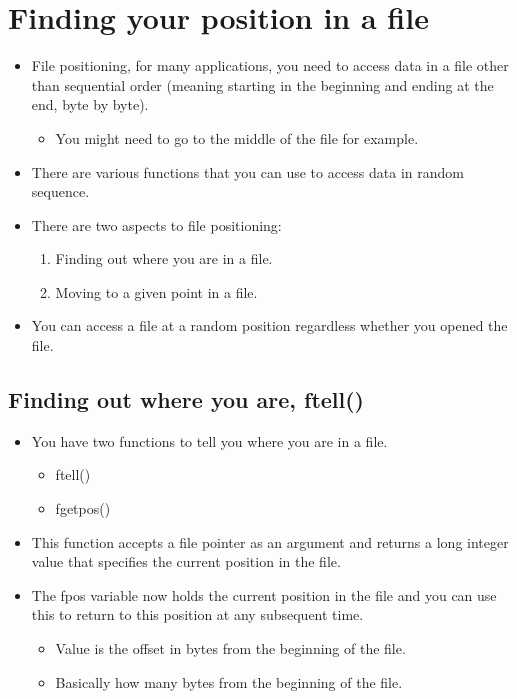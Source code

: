 \section{Finding your position in a file}
\begin{itemize}
    \item File positioning, for many applications, you need to access data in a file other than sequential order (meaning starting in the beginning and ending at the end, byte by byte).
        \begin{itemize}
            \item You might need to go to the middle of the file for example.
        \end{itemize}
    
    \item There are various functions that you can use to access data in random sequence.
    \item There are two aspects to file positioning:
        \begin{enumerate}
            \item Finding out where you are in a file.
            \item Moving to a given point in a file. 
        \end{enumerate}
    
    \item You can access a file at a random position regardless whether you opened the file.
\end{itemize}

\subsection{Finding out where you are, ftell()}
\begin{itemize}
    \item You have two functions to tell you where you are in a file.
        \begin{itemize}
            \item ftell() 
            \item fgetpos()
        \end{itemize}
    
    \item This function accepts a file pointer as an argument and returns a long integer value that specifies the current position in the file.
    
    \item The fpos variable now holds the current position in the file and you can use this to return to this position at any subsequent time.
        \begin{itemize}
            \item Value is the offset in bytes from the beginning of the file.
            \item Basically how many bytes from the beginning of the file.
        \end{itemize}
    
\end{itemize}

